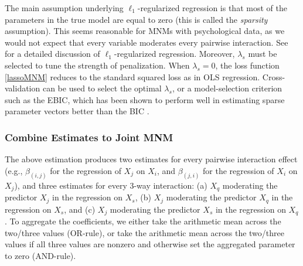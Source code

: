 The main assumption underlying $\ell_1$-regularized regression is that most of the parameters in the true model are equal to zero (this is called the \textit{sparsity} assumption). This seems reasonable for MNMs with psychological data, as we would not expect that every variable moderates every pairwise interaction. See \cite{hastie2015statistical} for a detailed discussion of $\ell_1$-regularized regression. Moreover, $\lambda_s$ must be selected to tune the strength of penalization. When $\lambda_s = 0$, the loss function \eqref{lassoMNM} reduces to the standard squared loss as in OLS regression. Cross-validation can be used to select the optimal $\lambda_s$, or a model-selection criterion such as the EBIC, which has been shown to perform well in estimating sparse parameter vectors \cite{foygel2010extended} better than the BIC \cite{schwarz1978estimating}.

\subsubsection{Combine Estimates to Joint MNM}
The above estimation produces two estimates for every pairwise interaction effect (e.g., $\beta_{(i,j)}$ for the regression of $X_j$ on $X_i$, and $\beta_{(j,i)}$ for the regression of $X_i$ on $X_j$), and three estimates for every 3-way interaction: (a) $X_q$ moderating the predictor $X_j$ in the regression on $X_s$, (b) $X_j$ moderating the predictor $X_q$ in the regression on $X_s$, and (c) $X_j$ moderating the predictor $X_s$ in the regression on $X_q$. To aggregate the coefficients, we either take the arithmetic mean across the two/three values (OR-rule), or take the arithmetic mean across the two/three values if all three values are nonzero and otherwise set the aggregated parameter to zero (AND-rule). 

